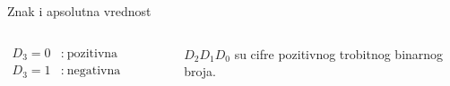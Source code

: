 \begin{frame}[label=04-s029]{Znak i apsolutna vrednost}
\begin{columns}[c,onlytextwidth]
\centering
{\fontsize{9}{10}\selectfont\renewcommand{\arraystretch}{.82}\setlength{\tabcolsep}{4pt}\par}
\[\begin{aligned}D_3=0&:\ \text{pozitivna vrednost}\\D_3=1&:\ \text{negativna vrednost}\end{aligned}\]
\par\vspace{4mm}
$D_2D_1D_0$ su cifre pozitivnog trobitnog binarnog broja.
\end{columns}
\end{frame}
